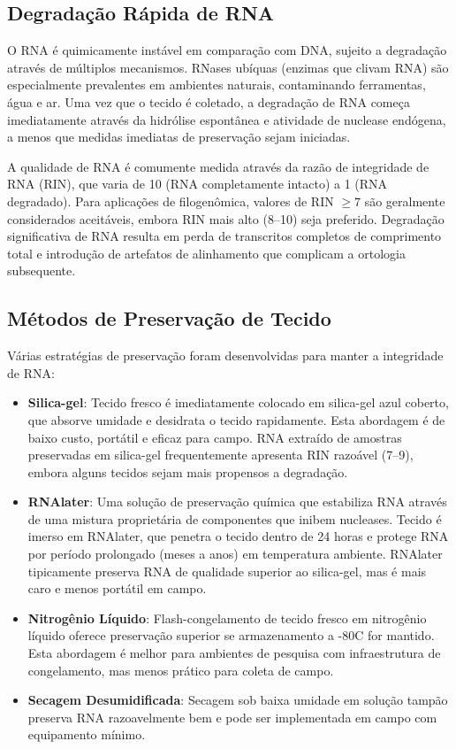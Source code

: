 \subsection{Degradação Rápida de RNA}

O RNA é quimicamente instável em comparação com DNA, sujeito a degradação através de múltiplos mecanismos. RNases ubíquas (enzimas que clivam RNA) são especialmente prevalentes em ambientes naturais, contaminando ferramentas, água e ar. Uma vez que o tecido é coletado, a degradação de RNA começa imediatamente através da hidrólise espontânea e atividade de nuclease endógena, a menos que medidas imediatas de preservação sejam iniciadas.

A qualidade de RNA é comumente medida através da razão de integridade de RNA (RIN), que varia de 10 (RNA completamente intacto) a 1 (RNA degradado). Para aplicações de filogenômica, valores de RIN $\geq 7$ são geralmente considerados aceitáveis, embora RIN mais alto (8--10) seja preferido. Degradação significativa de RNA resulta em perda de transcritos completos de comprimento total e introdução de artefatos de alinhamento que complicam a ortologia subsequente.

\subsection{Métodos de Preservação de Tecido}

Várias estratégias de preservação foram desenvolvidas para manter a integridade de RNA:

\begin{itemize}
\item \textbf{Silica-gel}: Tecido fresco é imediatamente colocado em silica-gel azul coberto, que absorve umidade e desidrata o tecido rapidamente. Esta abordagem é de baixo custo, portátil e eficaz para campo. RNA extraído de amostras preservadas em silica-gel frequentemente apresenta RIN razoável (7--9), embora alguns tecidos sejam mais propensos a degradação.

\item \textbf{RNAlater}: Uma solução de preservação química que estabiliza RNA através de uma mistura proprietária de componentes que inibem nucleases. Tecido é imerso em RNAlater, que penetra o tecido dentro de 24 horas e protege RNA por período prolongado (meses a anos) em temperatura ambiente. RNAlater tipicamente preserva RNA de qualidade superior ao silica-gel, mas é mais caro e menos portátil em campo.

\item \textbf{Nitrogênio Líquido}: Flash-congelamento de tecido fresco em nitrogênio líquido oferece preservação superior se armazenamento a -80\textdegree{}C for mantido. Esta abordagem é melhor para ambientes de pesquisa com infraestrutura de congelamento, mas menos prático para coleta de campo.

\item \textbf{Secagem Desumidificada}: Secagem sob baixa umidade em solução tampão preserva RNA razoavelmente bem e pode ser implementada em campo com equipamento mínimo.
\end{itemize}


